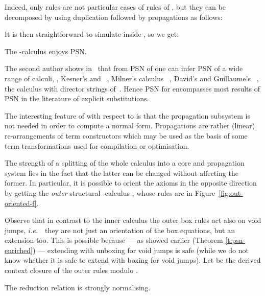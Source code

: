\documentclass{LMCS}
\newcommand{\ie}{{\it  i.e.}~}
\renewcommand{\>}{\rightarrow}
\newcommand{\ignore}[1]{}
\begin{document}
Indeed, only rules  are not particular
cases of rules of , but they can be decomposed 
by using duplication followed by propagations 
as follows:


It is then straightforward to simulate  inside , so we get:


\begin{cor}
\label{cor:les-psn}
The -calculus enjoys PSN.
\end{cor}

The second author shows in~\cite{Kes09}
that from PSN of  one can infer PSN of a wide range of calculi,
, Kesner's  and ~\cite{Kes07},
Milner's calculus ~\cite{Milner07}, David's
and Guillaume's ~\cite{DBLP:journals/mscs/DavidG01}, the
calculus with director strings of~\cite{SinotFM03}. Hence PSN for  encompasses
most results of PSN in the literature of explicit substitutions.

\noindent The interesting feature of  with respect to  is that
the propagation subsystem  is not needed in order to
compute a normal form. Propagations are rather (linear)
re-arrangements of term constructors which may be used as the basis of
some term transformations used for compilation or
optimisation.\medskip

The strength of a splitting of the whole calculus into a core and 
propagation system lies in the fact that 
the latter can be changed without affecting the former. In
particular, it is possible to orient the axioms  in the opposite direction 
by getting the \textit{outer} structural -calculus
, whose rules are in Figure~\ref{fig:out-oriented-f}.

Observe that  in contrast  to the inner  calculus the outer  box rules
act also on  void jumps,  \ie\ they  are not
just an orientation  of the box equations, but  an extension too. This
is  possible because  --- as  showed  earlier (Theorem
\ref{t:psn-enriched})       ---       extending             with
unboxing for void jumps is safe (while we
do  not know  whether it  is safe  to extend   with
boxing for  void  jumps).    Let
  be  the derived  context  closure  of  the outer  rules
 modulo .


\begin{lem}
\label{l:out-terminates}
The reduction relation  is strongly normalising.
\end{lem}

\ignore{
\begin{proof}
Informal proof: let  denote the size of a context. Then define 
, \ie, the sum of the size of the contexts containing each jump of . It is easily seen that such a measure decreases with any -step and is invariant by .
\end{proof}}
\end{document}
